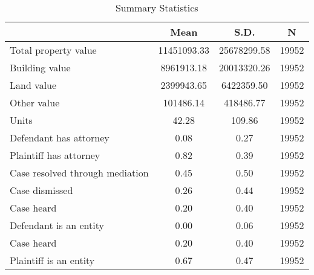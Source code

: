 \begin{table}[htbp]\centering
\def\sym#1{\ifmmode^{#1}\else\(^{#1}\)\fi}
\caption{Summary Statistics}
\begin{tabular}{l*{1}{ccc}}
\toprule
                    &        Mean&        S.D.&           N\\
\midrule
Total property value& 11451093.33& 25678299.58&       19952\\
Building value      &  8961913.18& 20013320.26&       19952\\
Land value          &  2399943.65&  6422359.50&       19952\\
Other value         &   101486.14&   418486.77&       19952\\
Units               &       42.28&      109.86&       19952\\
Defendant has attorney&        0.08&        0.27&       19952\\
Plaintiff has attorney&        0.82&        0.39&       19952\\
Case resolved through mediation&        0.45&        0.50&       19952\\
Case dismissed      &        0.26&        0.44&       19952\\
Case heard          &        0.20&        0.40&       19952\\
Defendant is an entity&        0.00&        0.06&       19952\\
Case heard          &        0.20&        0.40&       19952\\
Plaintiff is an entity&        0.67&        0.47&       19952\\
\bottomrule
\end{tabular}
\end{table}
